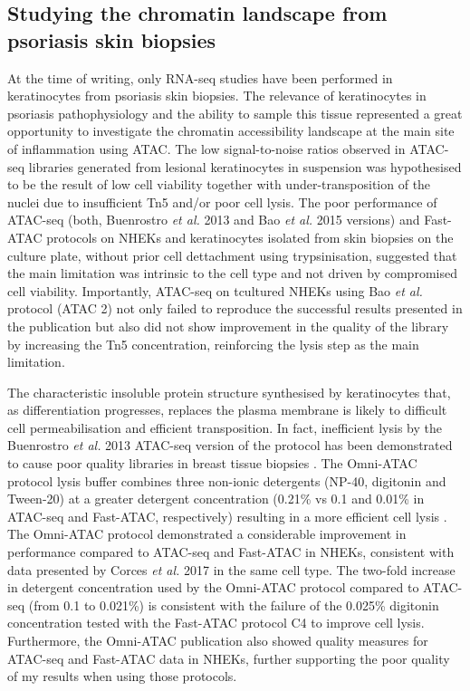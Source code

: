 \subsection{Studying the chromatin landscape from psoriasis skin biopsies}
At the time of writing, only RNA-seq studies have been performed in keratinocytes from psoriasis skin biopsies. The relevance of keratinocytes in psoriasis pathophysiology and the ability to sample this tissue represented a great opportunity to investigate the chromatin accessibility landscape at the main site of inflammation using ATAC. The low signal-to-noise ratios observed in ATAC-seq libraries generated from lesional keratinocytes in suspension was hypothesised to be the result of low cell viability together with under-transposition of the nuclei due to insufficient Tn5 and/or poor cell lysis. The poor performance of ATAC-seq (both, Buenrostro \textit{et al.} 2013 and Bao \textit{et al.} 2015 versions) and Fast-ATAC protocols on NHEKs and keratinocytes isolated from skin biopsies on the culture plate, without prior cell dettachment using trypsinisation, suggested that the main limitation was intrinsic to the cell type and not driven by compromised cell viability. Importantly, ATAC-seq on tcultured NHEKs using Bao \textit{et al.} protocol (ATAC 2) not only failed to reproduce the successful results presented in the publication but also did not show improvement in the quality of the library by increasing the Tn5 concentration, reinforcing the lysis step as the main limitation.

The characteristic insoluble protein structure synthesised by keratinocytes that, as differentiation progresses, replaces the plasma membrane is likely to difficult cell permeabilisation and efficient transposition. In fact, inefficient lysis by the Buenrostro \textit{et al.} 2013 ATAC-seq version of the protocol has been demonstrated to cause poor quality libraries in breast tissue biopsies \parencite{Fujiwara2019}. The Omni-ATAC protocol lysis buffer combines three non-ionic detergents (NP-40, digitonin and Tween-20) at a greater detergent concentration (0.21\% vs 0.1 and 0.01\% in ATAC-seq and Fast-ATAC, respectively) resulting in a more efficient cell lysis \parencite{Corces2017}.  The Omni-ATAC protocol demonstrated a considerable improvement in performance compared to ATAC-seq and Fast-ATAC in NHEKs, consistent with data presented by Corces \textit{et al.} 2017 in the same cell type. The two-fold increase in detergent concentration used by the Omni-ATAC protocol compared to ATAC-seq (from 0.1 to 0.021\%) is consistent with the failure of the 0.025\% digitonin concentration tested with the Fast-ATAC protocol C4 to improve cell lysis. Furthermore, the Omni-ATAC publication also showed quality measures for ATAC-seq and Fast-ATAC data in NHEKs, further supporting the poor quality of my results when using those protocols. 

